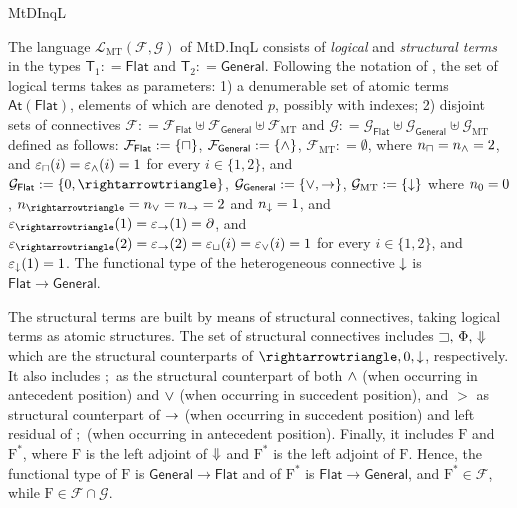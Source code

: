 \begin{entry}{MtDInqL}
\begin{clarifications}
  The language $\mathcal{L}_\mathrm{MT}(\mathcal{F}, \mathcal{G})$ of  MtD.InqL
  consists of  {\em logical}   and {\em structural terms} in the types
  $\mathsf{T}_1:  = \mathsf{Flat}$ and $\mathsf{T}_2: = \mathsf{General}$.
  Following the notation of , the set  of logical terms takes as
  parameters: 1) a denumerable  set of atomic terms $\mathsf{At}(\mathsf{Flat})$,
  elements of which are denoted $p$, possibly with indexes; 2) disjoint sets of
  connectives 
  $\mathcal{F}: = \mathcal{F}_{\mathsf{Flat}}\uplus\mathcal{F}_{\mathsf{General}}\uplus\mathcal{F}_{\mathrm{MT}}$
  and 
  $\mathcal{G}: = \mathcal{G}_{\mathsf{Flat}}\uplus\mathcal{G}_{\mathsf{General}}\uplus\mathcal{G}_{\mathrm{MT}}$
  defined as follows:
  $\mathcal{F}_{\mathsf{Flat}}: = \{\sqcap\}$, $\mathcal{F}_{\mathsf{General}}: = \{\wedge \}$, $\mathcal{F}_{\mathrm{MT}}: = \emptyset$, 
  where $n_\sqcap = n_\wedge = 2$, 
  and $\varepsilon_{\sqcap}(i) = \varepsilon_{\wedge}(i) = 1$ for every $i\in \{1, 2\}$, 
  and
  $\mathcal{G}_{\mathsf{Flat}}: = \{\cbot, \cra\}$, $\mathcal{G}_{\mathsf{General}}: = \{\vee,\to \}$, $\mathcal{G}_{\mathrm{MT}}: = \{{\downarrow}\}$ 
  where  $n_0 = 0$, $n_\cra = n_\ior = n_{\ira} =  2$ 
  and $n_{{\downarrow}} = 1$, 
  and $\varepsilon_{\cra}(1) = \varepsilon_{\ira}(1) = \partial$, 
  and $\varepsilon_{\cra}(2) = \varepsilon_{\ira}(2) = \varepsilon_{\cor}(i) = \varepsilon_{\ior}(i) = 1$ 
  for every $i\in \{1, 2\}$, 
  and $\varepsilon_{{\downarrow}}(1) = 1$. 
  The functional type of the heterogeneous connective ${\downarrow}$ is
  $\mathsf{Flat}\rightarrow \mathsf{General}$.
  
  The structural terms are built by means of structural connectives, taking
  logical terms as atomic structures. The set of structural connectives includes
  $\sqsupset,\, \Phi,\, {\Downarrow}$   which are the structural counterparts of $\cra, \cbot,
  \bh$, respectively.  It also includes $;$  as the structural counterpart of both
  $\wedge$ (when occurring in antecedent position) and $\vee$ (when occurring in
  succedent position), and $>$ as structural counterpart of  $\to$ (when
  occurring in succedent position) and left residual of $;$ (when occurring in
  antecedent position).
  Finally, it includes $\mathrm{F}$ and $\mathrm{F}^\ast$, where $\mathrm{F}$ is
  the left adjoint of ${\Downarrow}$ and  $\mathrm{F}^\ast$ is the left  adjoint of
  $\mathrm{F}$. Hence, the functional type of $\mathrm{F}$ is
  $\mathsf{General}\rightarrow \mathsf{Flat}$ and of $\mathrm{F}^\ast$ is
  $\mathsf{Flat}\rightarrow \mathsf{General}$, and  $\mathrm{F}^\ast\in
  \mathcal{F}$, while $\mathrm{F}\in \mathcal{F}\cap \mathcal{G}$.
  

\end{clarifications}
\end{entry}
